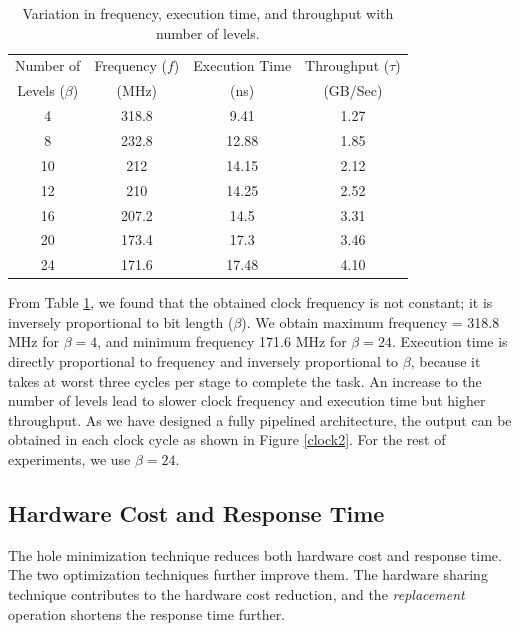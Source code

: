 \documentclass[10pt, conference, compsocconf]{IEEEtran}
\begin{document}
 \begin{table}
 \begin{center}
 \caption{Variation in frequency, execution time, and throughput with number of levels.}
\label{table1}
\begin{tabular}{ |c|c|c|c| }
 \hline
 Number of & Frequency ($f$) & Execution Time& Throughput ($\tau$) \\
 Levels ($\beta$) & (MHz)& (ns)& (GB/Sec)\\
 \hline
 \hline
 4 & 318.8 & 9.41 & 1.27\\
 8 & 232.8 & 12.88 & 1.85\\
 10 & 212 & 14.15 & 2.12 \\
 12 & 210 & 14.25 & 2.52 \\
 16 & 207.2 & 14.5 & 3.31\\
 20 & 173.4 & 17.3 & 3.46 \\
 24 & 171.6 & 17.48 & 4.10\\
 \hline
\end{tabular}
\end{center}
\end{table}

From Table \ref{table1}, we found that the obtained clock frequency is not constant; it is inversely proportional to bit length ($\beta$).
We obtain maximum frequency = 318.8 MHz for $\beta = 4$, and minimum frequency 171.6 MHz for $\beta = 24$.
Execution time is directly proportional to frequency and inversely proportional to $\beta$, because it takes at worst three cycles per stage to complete the task.
An increase to the number of levels lead to slower clock frequency and execution time but higher throughput.
As we have designed a fully pipelined architecture, the output can be obtained in each clock cycle as shown in Figure \ref{clock2}.
For the rest of experiments, we use $\beta = 24$.

\subsection{Hardware Cost and Response Time}

The hole minimization technique reduces both hardware cost and response time.
The two optimization techniques further improve them.
The hardware sharing technique contributes to the hardware cost reduction, and the {\it replacement} operation shortens the response time further.
\end{document}
